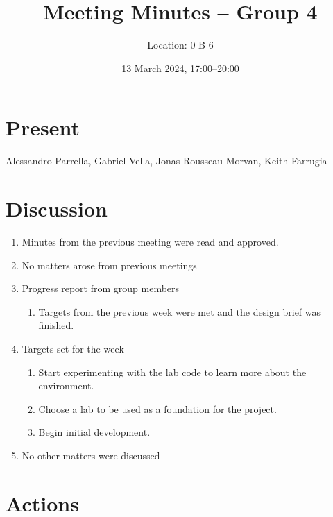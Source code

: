 \documentclass{cce2014-meetings}
\title{Meeting Minutes -- Group 4}
\author{Location: 0 B 6}
\date{13 March 2024, 17:00--20:00}
\begin{document}
\maketitle

\section*{Present}
Alessandro Parrella,
Gabriel Vella,
Jonas Rousseau-Morvan,
Keith Farrugia

\section*{Discussion}

\begin{enumerate}


      \item Minutes from the previous meeting were read and approved.

      \item No matters arose from previous meetings

      \item Progress report from group members
            \begin{enumerate}
                  \item Targets from the previous week were met and the design brief was finished.
            \end{enumerate}

      \item Targets set for the week
            \begin{enumerate}
                  \item Start experimenting with the lab code to learn more about the environment.
                  \item Choose a lab to be used as a foundation for the project.
                  \item Begin initial development. 
            \end{enumerate}
            
      \item No other matters were discussed
\end{enumerate}

\section*{Actions}
\end{document}
